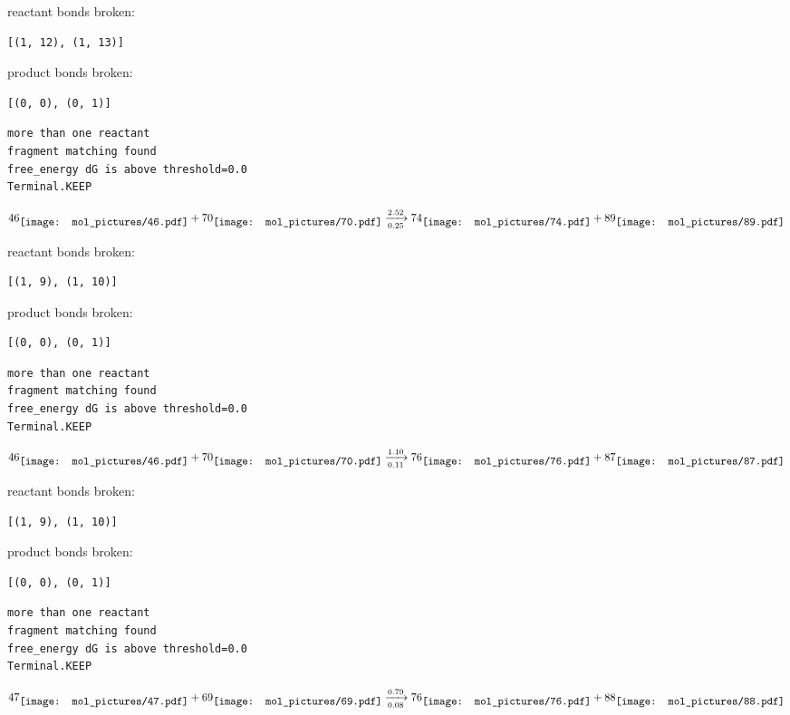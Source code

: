 \documentclass{article}
\begin{document}
reactant bonds broken:\begin{verbatim}
[(1, 12), (1, 13)]
\end{verbatim}
product bonds broken:\begin{verbatim}
[(0, 0), (0, 1)]
\end{verbatim}




\vspace{1cm}
\begin{verbatim}
more than one reactant
fragment matching found
free_energy dG is above threshold=0.0
Terminal.KEEP
\end{verbatim}
$$
46
\raisebox{-.5\height}{\texttt{[image: mol\_pictures/46.pdf]}}
+
70
\raisebox{-.5\height}{\texttt{[image: mol\_pictures/70.pdf]}}
\xrightarrow[0.25]{2.52}
74
\raisebox{-.5\height}{\texttt{[image: mol\_pictures/74.pdf]}}
+
89
\raisebox{-.5\height}{\texttt{[image: mol\_pictures/89.pdf]}}
$$


reactant bonds broken:\begin{verbatim}
[(1, 9), (1, 10)]
\end{verbatim}
product bonds broken:\begin{verbatim}
[(0, 0), (0, 1)]
\end{verbatim}




\vspace{1cm}
\begin{verbatim}
more than one reactant
fragment matching found
free_energy dG is above threshold=0.0
Terminal.KEEP
\end{verbatim}
$$
46
\raisebox{-.5\height}{\texttt{[image: mol\_pictures/46.pdf]}}
+
70
\raisebox{-.5\height}{\texttt{[image: mol\_pictures/70.pdf]}}
\xrightarrow[0.11]{1.10}
76
\raisebox{-.5\height}{\texttt{[image: mol\_pictures/76.pdf]}}
+
87
\raisebox{-.5\height}{\texttt{[image: mol\_pictures/87.pdf]}}
$$


reactant bonds broken:\begin{verbatim}
[(1, 9), (1, 10)]
\end{verbatim}
product bonds broken:\begin{verbatim}
[(0, 0), (0, 1)]
\end{verbatim}




\vspace{1cm}
\begin{verbatim}
more than one reactant
fragment matching found
free_energy dG is above threshold=0.0
Terminal.KEEP
\end{verbatim}
$$
47
\raisebox{-.5\height}{\texttt{[image: mol\_pictures/47.pdf]}}
+
69
\raisebox{-.5\height}{\texttt{[image: mol\_pictures/69.pdf]}}
\xrightarrow[0.08]{0.79}
76
\raisebox{-.5\height}{\texttt{[image: mol\_pictures/76.pdf]}}
+
88
\raisebox{-.5\height}{\texttt{[image: mol\_pictures/88.pdf]}}
$$
\end{document}
